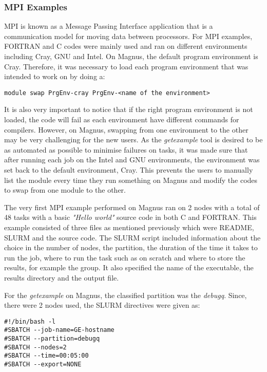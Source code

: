 \subsubsection{MPI Examples}

MPI is known as a Message Passing Interface application that is a communication model for moving data between processors. For MPI examples, FORTRAN and 
C codes were mainly used and ran on different environments including Cray, GNU and Intel. On Magnus, the default program environment is Cray. Therefore, 
it was necessary to load each program environment that was intended to work on by doing a:

\begin{tcolorbox}
\begin{Verbatim}[fontsize=\scriptsize]
module swap PrgEnv-cray PrgEnv-<name of the environment>
\end{Verbatim}
\end{tcolorbox}

It is also very important to notice that if the right program environment is not loaded, the code will fail as each environment have different commands 
for compilers. However, on Magnus, swapping from one environment to the other may be very challenging for the new users. As the \emph{getexample} tool is
desired to be as automated as possible to minimise failures on tasks, it was made sure that after running each job on the Intel and GNU environments, the
environment was set back to the default environment, Cray. This prevents the users to manually list the module every time they run something on Magnus
and modify the codes to swap from one module to the other. 

The very first MPI example performed on Magnus ran on 2 nodes with a total of 48 tasks with a basic \emph{"Hello world"} source code in both C and FORTRAN. 
This example consisted of three files as mentioned previously which were README, SLURM and the source code. The SLURM script included information about
the choice in the number of nodes, the partition, the duration of the time it takes to run the job, where to run the task such as on scratch and where
to store the results, for example the group. It also specified the name of the executable, the results directory and the output file. 

For the \emph{getexample} on Magnus, the classified partition was the \emph{debugq}. Since, there were 2 nodes used, the SLURM directives were given as:

\begin{tcolorbox}
\begin{Verbatim}[fontsize=\scriptsize]
#!/bin/bash -l
#SBATCH --job-name=GE-hostname
#SBATCH --partition=debugq
#SBATCH --nodes=2
#SBATCH --time=00:05:00
#SBATCH --export=NONE
\end{Verbatim}
\end{tcolorbox}

